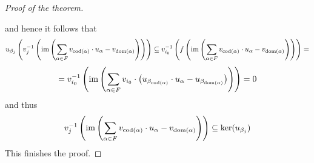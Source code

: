 \begin{proof}[Proof of the theorem]
\begin{center}
\end{center}
and hence it follows that
$$u_{\beta_j}\left(v_j^{-1}\left(\mathrm{im}\left(\sum_{\alpha \in F} v_{\mathrm{cod}(\alpha)}\cdot u_{\alpha}-v_{\mathrm{dom}(\alpha)}\right)\right)\right)\subseteq  v_{i_0}^{-1}\left(f\left(\mathrm{im}\left(\sum_{\alpha \in F} v_{\mathrm{cod}(\alpha)}\cdot u_{\alpha}-v_{\mathrm{dom}(\alpha)}\right)\right)\right)=$$
$$= v_{i_0}^{-1}\left(\mathrm{im}\left(\sum_{\alpha \in F}v_{i_0}\cdot \left(u_{\beta_{\mathrm{cod}(\alpha)}}\cdot u_{\alpha}- u_{\beta_{\mathrm{dom}(\alpha)}}\right)\right)\right)=0$$
and thus
$$v_j^{-1}\left(\mathrm{im}\left(\sum_{\alpha \in F} v_{\mathrm{cod}(\alpha)}\cdot u_{\alpha}-v_{\mathrm{dom}(\alpha)}\right)\right)\subseteq \ker(u_{\beta_j})$$
This finishes the proof.
\end{proof}

